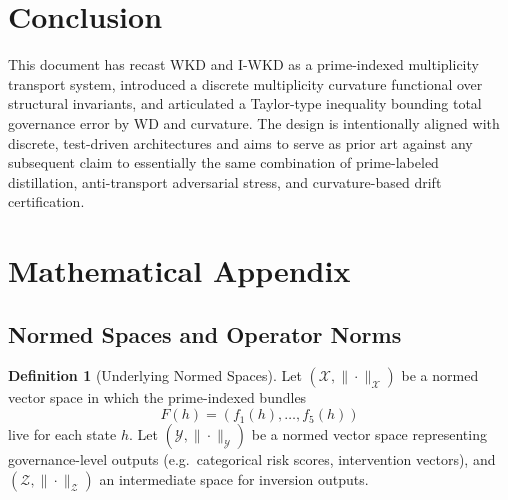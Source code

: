 \documentclass[11pt]{article}
\theoremstyle{definition}
\theoremstyle{plain}
\theoremstyle{remark}
\begin{document}
\section{Conclusion}

This document has recast WKD and I-WKD as a prime-indexed multiplicity transport system, introduced a discrete multiplicity curvature functional over structural invariants, and articulated a Taylor-type inequality bounding total governance error by WD and curvature. The design is intentionally aligned with discrete, test-driven architectures and aims to serve as prior art against any subsequent claim to essentially the same combination of prime-labeled distillation, anti-transport adversarial stress, and curvature-based drift certification.

\appendix
\section*{Mathematical Appendix}
\renewcommand{\thesubsection}{A.\arabic{subsection}}
\renewcommand{\thedefn}{A.\arabic{defn}}
\renewcommand{\thethm}{A.\arabic{thm}}
\renewcommand{\thelem}{A.\arabic{lem}}
\renewcommand{\theassump}{A.\arabic{assump}}
\setcounter{section}{0}
\setcounter{defn}{0}
\setcounter{thm}{0}
\setcounter{lem}{0}
\setcounter{assump}{0}

\theoremstyle{definition}
\newtheorem{adefn}{Definition}[section]
\newtheorem{aassump}[adefn]{Assumption}

\theoremstyle{plain}
\newtheorem{athm}[adefn]{Theorem}
\newtheorem{alem}[adefn]{Lemma}
\newtheorem{aprop}[adefn]{Proposition}
\newtheorem{acor}[adefn]{Corollary}

\theoremstyle{remark}
\newtheorem{aremark}[adefn]{Remark}

\subsection{Normed Spaces and Operator Norms}

\begin{adefn}[Underlying Normed Spaces]
Let \((\mathcal{X},\|\cdot\|_{\mathcal{X}})\) be a normed vector space in which the prime-indexed bundles
\[
  F(h) = (f_1(h),\dots,f_5(h))
\]
live for each state \(h\). Let \((\mathcal{Y},\|\cdot\|_{\mathcal{Y}})\) be a normed vector space representing governance-level outputs (e.g.\ categorical risk scores, intervention vectors), and \((\mathcal{Z},\|\cdot\|_{\mathcal{Z}})\) an intermediate space for inversion outputs.
\end{adefn}
\end{document}
